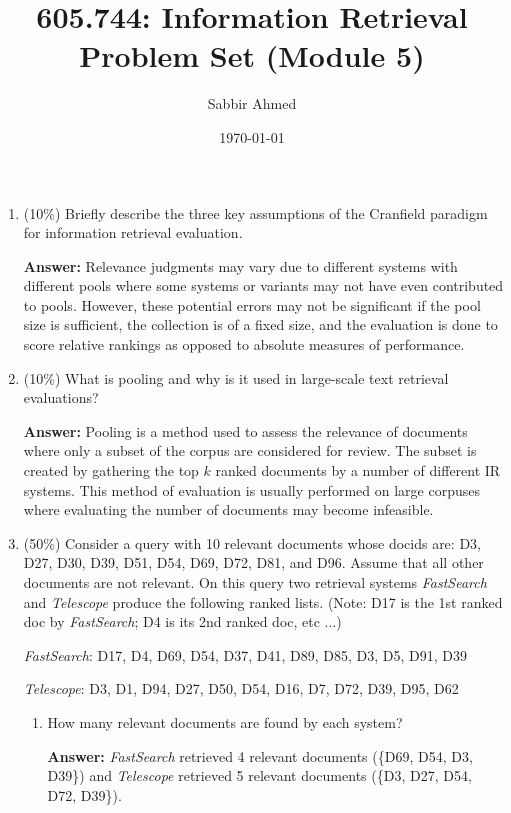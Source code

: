\documentclass[11pt]{article}
\title{605.744: Information Retrieval \\ Problem Set (Module 5)}
\author{Sabbir Ahmed}
\date{\today}
\begin{document}
\maketitle

    \begin{enumerate}

        \item (10\%) Briefly describe the three key assumptions of the Cranfield paradigm for information retrieval evaluation.

        \textbf{Answer:} Relevance judgments may vary due to different systems with different pools where some systems or variants may not have even contributed to pools. However, these potential errors may not be significant if the pool size is sufficient, the collection is of a fixed size, and the evaluation is done to score relative rankings as opposed to absolute measures of performance.

        \item (10\%) What is pooling and why is it used in large-scale text retrieval evaluations?

        \textbf{Answer:} Pooling is a method used to assess the relevance of documents where only a subset of the corpus are considered for review. The subset is created by gathering the top $k$ ranked documents by a number of different IR systems. This method of evaluation is usually performed on large corpuses where evaluating the number of documents may become infeasible.

        \item (50\%) Consider a query with 10 relevant documents whose docids are: 
        D3, D27, D30, D39, D51, D54, D69, D72, D81, and D96. Assume that all other documents are not relevant. On this query two retrieval systems \textit{FastSearch} and \textit{Telescope} produce the following ranked lists. (Note: D17 is the 1st ranked doc by \textit{FastSearch}; D4 is its 2nd ranked doc, etc ...)

        \textit{FastSearch}: D17, D4, D69, D54, D37, D41, D89, D85, D3, D5, D91, D39

        \textit{Telescope}: D3, D1, D94, D27, D50, D54, D16, D7, D72, D39, D95, D62

        \begin{enumerate}

            \item How many relevant documents are found by each system?

            \textbf{Answer:} \textit{FastSearch} retrieved 4 relevant documents (\{D69, D54, D3, D39\}) and \textit{Telescope} retrieved 5 relevant documents (\{D3, D27, D54, D72, D39\}).


\end{enumerate}
\end{enumerate}
\end{document}
